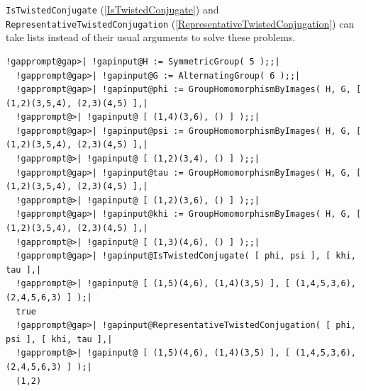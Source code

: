 \documentclass[a4paper,11pt]{report}
\begin{document}
{{ \texttt{IsTwistedConjugate} (\ref{IsTwistedConjugate}) and \texttt{RepresentativeTwistedConjugation} (\ref{RepresentativeTwistedConjugation}) can take lists instead of their usual arguments to solve these problems. 
\begin{Verbatim}[commandchars=!@|,fontsize=\small,frame=single,label=Example]
  !gapprompt@gap>| !gapinput@H := SymmetricGroup( 5 );;|
  !gapprompt@gap>| !gapinput@G := AlternatingGroup( 6 );;|
  !gapprompt@gap>| !gapinput@phi := GroupHomomorphismByImages( H, G, [ (1,2)(3,5,4), (2,3)(4,5) ],|
  !gapprompt@>| !gapinput@ [ (1,4)(3,6), () ] );;|
  !gapprompt@gap>| !gapinput@psi := GroupHomomorphismByImages( H, G, [ (1,2)(3,5,4), (2,3)(4,5) ],|
  !gapprompt@>| !gapinput@ [ (1,2)(3,4), () ] );;|
  !gapprompt@gap>| !gapinput@tau := GroupHomomorphismByImages( H, G, [ (1,2)(3,5,4), (2,3)(4,5) ],|
  !gapprompt@>| !gapinput@ [ (1,2)(3,6), () ] );;|
  !gapprompt@gap>| !gapinput@khi := GroupHomomorphismByImages( H, G, [ (1,2)(3,5,4), (2,3)(4,5) ],|
  !gapprompt@>| !gapinput@ [ (1,3)(4,6), () ] );;|
  !gapprompt@gap>| !gapinput@IsTwistedConjugate( [ phi, psi ], [ khi, tau ],|
  !gapprompt@>| !gapinput@ [ (1,5)(4,6), (1,4)(3,5) ], [ (1,4,5,3,6), (2,4,5,6,3) ] );|
  true
  !gapprompt@gap>| !gapinput@RepresentativeTwistedConjugation( [ phi, psi ], [ khi, tau ],|
  !gapprompt@>| !gapinput@ [ (1,5)(4,6), (1,4)(3,5) ], [ (1,4,5,3,6), (2,4,5,6,3) ] );|
  (1,2)
\end{Verbatim}
 }

 }

   
\end{document}
